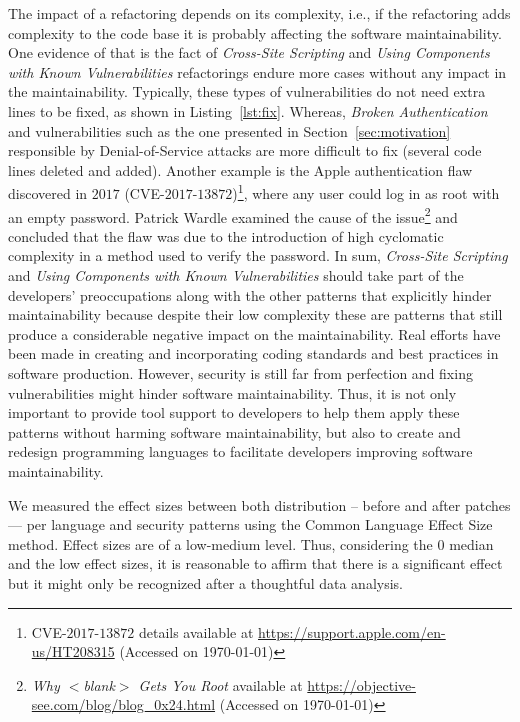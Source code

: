 \documentclass[sigconf,review]{acmart}
\begin{document}
The impact of a refactoring depends on its complexity, i.e., if the refactoring
adds complexity to the code base it is probably affecting the software
maintainability. One evidence of that is the fact of \emph{Cross-Site Scripting}
and \emph{Using Components with Known Vulnerabilities} refactorings endure more
cases without any impact in the maintainability. Typically, these types of
vulnerabilities do not need extra lines to be fixed, as shown in
Listing~\ref{lst:fix}. Whereas, \emph{Broken Authentication} and vulnerabilities
such as the one presented in Section~\ref{sec:motivation} responsible by Denial-of-Service
attacks are more difficult to fix (several code lines deleted and added).
Another example is the Apple authentication flaw discovered in $2017$
(CVE-$2017$-$13872$)\footnote{CVE-$2017$-$13872$ details available at
\url{https://support.apple.com/en-us/HT208315} (Accessed on \today{})}, where any user
could log in as root with an empty password. Patrick Wardle examined the cause
of the issue\footnote{\emph{Why $<$blank$>$ Gets You Root} available at
\url{https://objective-see.com/blog/blog\_0x24.html} (Accessed on \today{})} and
concluded that the flaw was due to the introduction of high cyclomatic complexity
in a method used to verify the password. In sum, \emph{Cross-Site Scripting} and
\emph{Using Components with Known Vulnerabilities} should take part of the
developers' preoccupations along with the other patterns that explicitly hinder
maintainability because despite their low complexity these are patterns that
still produce a considerable negative impact on the maintainability. Real
efforts have been made in creating and incorporating coding standards and best
practices in software production. However, security is still far from perfection
and fixing vulnerabilities might hinder software maintainability. Thus, it is
not only important to provide tool support to developers to help them apply these
patterns without harming software maintainability, but also to create and redesign
programming languages to facilitate developers improving software maintainability.


We measured the effect sizes between both distribution -- before and after
patches --- per language and security patterns using the Common Language Effect
Size~\cite{cliff:1993} method. Effect sizes are of a low-medium level.
Thus, considering the $0$ median and the low effect sizes, it is reasonable
to affirm that there is a significant effect but it might only be
recognized after a thoughtful data analysis.
\end{document}
